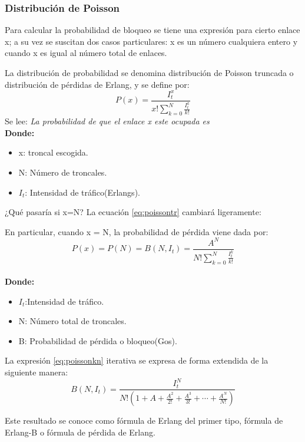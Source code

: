 \documentclass[
	12pt, %
	fleqn, %
	a4paper, %
	oneside, %
]{LegrandOrangeBook}
\begin{document}
\subsubsection{Distribución de Poisson}
Para calcular la probabilidad de bloqueo se tiene una expresión para cierto enlace x; a su vez se suscitan dos casos particulares: x es un número cualquiera entero y cuando x es igual al número total de enlaces.
\begin{definition}
La distribución de probabilidad se denomina distribución de Poisson truncada o distribución de pérdidas de Erlang, y se define por:
\begin{equation}\label{eq:poissontr}
P(x)=\frac{I_t^x}{x!\sum^{N}_{k=0}\frac{I_t^k}{k!}}
\end{equation}
Se lee: \textit{La probabilidad de que el enlace x este ocupada es}\\
\textbf{Donde:}
\begin{itemize}
\item x: troncal escogida.
\item N: Número de troncales.
\item $I_t$: Intensidad de tráfico(Erlangs).
\end{itemize}
\end{definition}
¿Qué pasaría si x=N? La ecuación \ref{eq:poissontr} cambiará ligeramente:
\begin{definition}
En particular, cuando x = N, la probabilidad de pérdida viene dada por:
\begin{equation}\label{eq:poissonkn}
P(x)=P(N)=B(N,I_t)=\frac{A^N}{N!\sum^{N}_{k=0}\frac{I_t^k}{k!}}
\end{equation}\\
\textbf{Donde:}
\begin{itemize}
\item $I_t$:Intensidad de tráfico.
\item N: Número total de troncales.
\item B: Probabilidad de pérdida o bloqueo(Gos).
\end{itemize}
La expresión \ref{eq:poissonkn} iterativa se expresa de forma extendida de la siguiente manera:\\
\begin{equation}
B(N,I_t)=\frac{I_t^N}{N!(1+A+\frac{A^2}{2!}+\frac{A^3}{3!}+\cdots+\frac{A^N}{N!})}
\end{equation}
\begin{remark}
Este resultado se conoce como fórmula de Erlang del primer tipo, fórmula de Erlang-B o fórmula de pérdida de Erlang.
\end{remark}
\end{definition}
\end{document}
